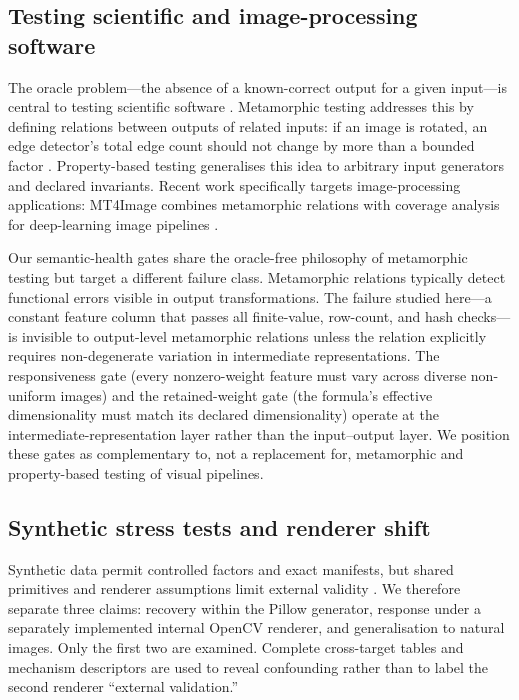 \subsection{Testing scientific and image-processing software}

The oracle problem---the absence of a known-correct output for a given input---is central to testing scientific software \citep{guderlei2007statistical,ding2010selfchecked}. Metamorphic testing addresses this by defining relations between outputs of related inputs: if an image is rotated, an edge detector's total edge count should not change by more than a bounded factor \citep{lin2018metamorphic}. Property-based testing generalises this idea to arbitrary input generators and declared invariants. Recent work specifically targets image-processing applications: MT4Image combines metamorphic relations with coverage analysis for deep-learning image pipelines \citep{mt4image2025}.

Our semantic-health gates share the oracle-free philosophy of metamorphic testing but target a different failure class. Metamorphic relations typically detect functional errors visible in output transformations. The failure studied here---a constant feature column that passes all finite-value, row-count, and hash checks---is invisible to output-level metamorphic relations unless the relation explicitly requires non-degenerate variation in intermediate representations. The responsiveness gate (every nonzero-weight feature must vary across diverse non-uniform images) and the retained-weight gate (the formula's effective dimensionality must match its declared dimensionality) operate at the intermediate-representation layer rather than the input--output layer. We position these gates as complementary to, not a replacement for, metamorphic and property-based testing of visual pipelines.

\subsection{Synthetic stress tests and renderer shift}

Synthetic data permit controlled factors and exact manifests, but shared primitives and renderer assumptions limit external validity \citep{tobin2017domainrandomization,torralba2011datasetbias}. We therefore separate three claims: recovery within the Pillow generator, response under a separately implemented internal OpenCV renderer, and generalisation to natural images. Only the first two are examined. Complete cross-target tables and mechanism descriptors are used to reveal confounding rather than to label the second renderer ``external validation.''
